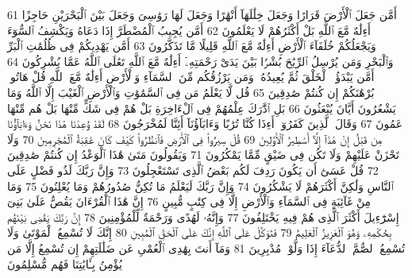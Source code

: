 {\tiny\colorbox{cl_aya}{61}} أَمَّن جَعَلَ ٱلْأَرْضَ قَرَارًا وَجَعَلَ خِلَٰلَهَآ أَنْهَٰرًا وَجَعَلَ لَهَا رَوَٰسِىَ وَجَعَلَ بَيْنَ ٱلْبَحْرَيْنِ حَاجِزًا أَءِلَٰهٌ مَّعَ ٱللَّهِ بَلْ أَكْثَرُهُمْ لَا يَعْلَمُونَ
{\tiny\colorbox{cl_aya}{62}} أَمَّن يُجِيبُ ٱلْمُضْطَرَّ إِذَا دَعَاهُ وَيَكْشِفُ ٱلسُّوٓءَ وَيَجْعَلُكُمْ خُلَفَآءَ ٱلْأَرْضِ أَءِلَٰهٌ مَّعَ ٱللَّهِ قَلِيلًا مَّا تَذَكَّرُونَ
{\tiny\colorbox{cl_aya}{63}} أَمَّن يَهْدِيكُمْ فِى ظُلُمَٰتِ ٱلْبَرِّ وَٱلْبَحْرِ وَمَن يُرْسِلُ ٱلرِّيَٰحَ بُشْرًۢا بَيْنَ يَدَىْ رَحْمَتِهِۦٓ أَءِلَٰهٌ مَّعَ ٱللَّهِ تَعَٰلَى ٱللَّهُ عَمَّا يُشْرِكُونَ
{\tiny\colorbox{cl_aya}{64}} أَمَّن يَبْدَؤُا۟ ٱلْخَلْقَ ثُمَّ يُعِيدُهُۥ وَمَن يَرْزُقُكُم مِّنَ ٱلسَّمَآءِ وَٱلْأَرْضِ أَءِلَٰهٌ مَّعَ ٱللَّهِ قُلْ هَاتُوا۟ بُرْهَٰنَكُمْ إِن كُنتُمْ صَٰدِقِينَ
{\tiny\colorbox{cl_aya}{65}} قُل لَّا يَعْلَمُ مَن فِى ٱلسَّمَٰوَٰتِ وَٱلْأَرْضِ ٱلْغَيْبَ إِلَّا ٱللَّهُ وَمَا يَشْعُرُونَ أَيَّانَ يُبْعَثُونَ
{\tiny\colorbox{cl_aya}{66}} بَلِ ٱدَّٰرَكَ عِلْمُهُمْ فِى ٱلْءَاخِرَةِ بَلْ هُمْ فِى شَكٍّ مِّنْهَا بَلْ هُم مِّنْهَا عَمُونَ
{\tiny\colorbox{cl_aya}{67}} وَقَالَ ٱلَّذِينَ كَفَرُوٓا۟ أَءِذَا كُنَّا تُرَٰبًا وَءَابَآؤُنَآ أَئِنَّا لَمُخْرَجُونَ
{\tiny\colorbox{cl_aya}{68}} لَقَدْ وُعِدْنَا هَٰذَا نَحْنُ وَءَابَآؤُنَا مِن قَبْلُ إِنْ هَٰذَآ إِلَّآ أَسَٰطِيرُ ٱلْأَوَّلِينَ
{\tiny\colorbox{cl_aya}{69}} قُلْ سِيرُوا۟ فِى ٱلْأَرْضِ فَٱنظُرُوا۟ كَيْفَ كَانَ عَٰقِبَةُ ٱلْمُجْرِمِينَ
{\tiny\colorbox{cl_aya}{70}} وَلَا تَحْزَنْ عَلَيْهِمْ وَلَا تَكُن فِى ضَيْقٍ مِّمَّا يَمْكُرُونَ
{\tiny\colorbox{cl_aya}{71}} وَيَقُولُونَ مَتَىٰ هَٰذَا ٱلْوَعْدُ إِن كُنتُمْ صَٰدِقِينَ
{\tiny\colorbox{cl_aya}{72}} قُلْ عَسَىٰٓ أَن يَكُونَ رَدِفَ لَكُم بَعْضُ ٱلَّذِى تَسْتَعْجِلُونَ
{\tiny\colorbox{cl_aya}{73}} وَإِنَّ رَبَّكَ لَذُو فَضْلٍ عَلَى ٱلنَّاسِ وَلَٰكِنَّ أَكْثَرَهُمْ لَا يَشْكُرُونَ
{\tiny\colorbox{cl_aya}{74}} وَإِنَّ رَبَّكَ لَيَعْلَمُ مَا تُكِنُّ صُدُورُهُمْ وَمَا يُعْلِنُونَ
{\tiny\colorbox{cl_aya}{75}} وَمَا مِنْ غَآئِبَةٍ فِى ٱلسَّمَآءِ وَٱلْأَرْضِ إِلَّا فِى كِتَٰبٍ مُّبِينٍ
{\tiny\colorbox{cl_aya}{76}} إِنَّ هَٰذَا ٱلْقُرْءَانَ يَقُصُّ عَلَىٰ بَنِىٓ إِسْرَٰٓءِيلَ أَكْثَرَ ٱلَّذِى هُمْ فِيهِ يَخْتَلِفُونَ
{\tiny\colorbox{cl_aya}{77}} وَإِنَّهُۥ لَهُدًى وَرَحْمَةٌ لِّلْمُؤْمِنِينَ
{\tiny\colorbox{cl_aya}{78}} إِنَّ رَبَّكَ يَقْضِى بَيْنَهُم بِحُكْمِهِۦ وَهُوَ ٱلْعَزِيزُ ٱلْعَلِيمُ
{\tiny\colorbox{cl_aya}{79}} فَتَوَكَّلْ عَلَى ٱللَّهِ إِنَّكَ عَلَى ٱلْحَقِّ ٱلْمُبِينِ
{\tiny\colorbox{cl_aya}{80}} إِنَّكَ لَا تُسْمِعُ ٱلْمَوْتَىٰ وَلَا تُسْمِعُ ٱلصُّمَّ ٱلدُّعَآءَ إِذَا وَلَّوْا۟ مُدْبِرِينَ
{\tiny\colorbox{cl_aya}{81}} وَمَآ أَنتَ بِهَٰدِى ٱلْعُمْىِ عَن ضَلَٰلَتِهِمْ إِن تُسْمِعُ إِلَّا مَن يُؤْمِنُ بِـَٔايَٰتِنَا فَهُم مُّسْلِمُونَ

